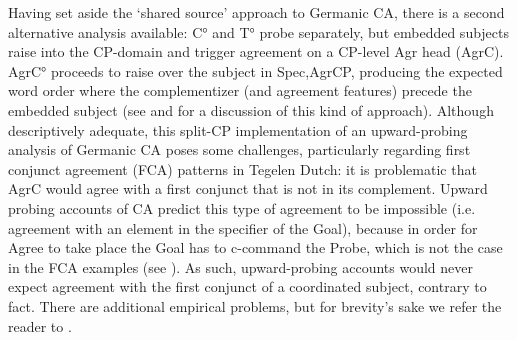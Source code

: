 \documentclass[output=paper
,modfonts
,nonflat
]{langsci/langscibook}
\begin{document}
Having set aside the `shared source' approach to Germanic CA, there is a second alternative analysis available: C° and T° probe separately, but embedded subjects raise into the CP-domain and trigger agreement on a CP-level Agr head (AgrC). AgrC° proceeds to raise over the subject in Spec,AgrCP, producing the expected word order where the complementizer (and agreement features) precede the embedded subject (see \citealt{Shlonsky:1994} and \citealt{Zwart:1993} for a discussion of this kind of approach). Although descriptively adequate, this split-CP implementation of an upward-probing analysis of Germanic CA poses some challenges, particularly regarding first conjunct agreement (FCA) patterns in Tegelen Dutch: it is problematic that AgrC would agree with a first conjunct that is not in its complement. Upward probing accounts of CA predict this type of agreement to be impossible (i.e. agreement with an element in the specifier of the Goal), because in order for Agree to take place the Goal has to c-command the Probe, which is not the case in the FCA examples (see \citealt{Baker:2008,Zeijlstra:2012,Wurmbrand:2011}). As such, upward-probing accounts would never expect agreement with the first conjunct of a coordinated subject, contrary to fact. There are additional empirical problems, but for brevity's sake we refer the reader to \citet{vanKoppen:2005,vanKoppen:2017}.


\end{document}
